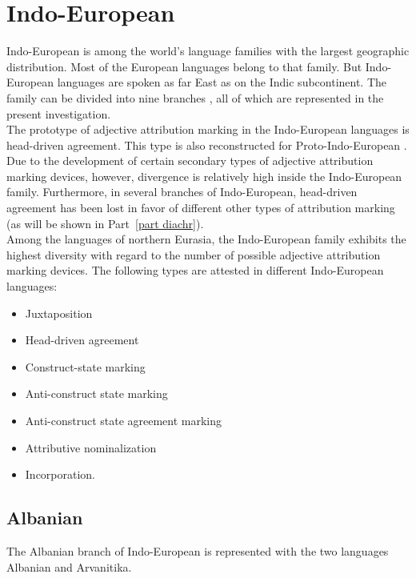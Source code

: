 \section{Indo-European}
Indo-European is among the world's language families with the largest geographic distribution. Most of the European languages belong to that family. But Indo-European languages are spoken as far East as on the Indic subcontinent. The family can be divided into nine branches \cite[218]{salminen2007}, all of which are represented in the present investigation.\\

\noindent The prototype of adjective attribution marking in the Indo-European languages is head-driven agreement. This type is also reconstructed for Proto-Indo-European \citep{decsy1991,watkins1998}. Due to the development of certain secondary types of adjective attribution marking devices, however, divergence is relatively high inside the Indo-European family. Furthermore, in several branches of Indo-European, head-driven agreement has been lost in favor of different other types of attribution marking (as will be shown in Part~\ref{part diachr}).\\

\noindent Among the languages of northern Eurasia, the Indo-European family exhibits the highest diversity with regard to the number of possible adjective attribution marking devices. The following types are attested in different Indo-European languages:
\begin{itemize}
\item Juxtaposition
\item Head-driven agreement
\item Construct-state marking
\item Anti-construct state marking
\item Anti-construct state agreement marking
\item Attributive nominalization
\item Incorporation.
\end{itemize}

\subsection{Albanian} \label{albanian synchr}
The Albanian branch of Indo-European is represented with the two languages Albanian and Arvanitika.

